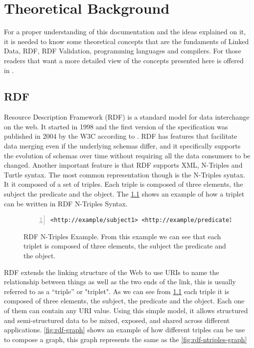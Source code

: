 \chapter{Theoretical Background}
\label{ch:theo-back}

For a proper understanding of this documentation and the ideas explained on it, it is
needed to know some theoretical concepts that are the fundaments of Linked Data, RDF,
RDF Validation, programming languages and compilers. For
those readers that want a more detailed view of the concepts
presented here is offered in \cite{labra-validating-rdf, eric-rdf-validation-lang,
programing-language}.


\section{RDF}
\label{sec:theo-back-rdf}
Resource Description Framework (RDF) is a standard model for data interchange on the web.
It started in 1998 and the first version of the specification was published in 2004 by the W3C
according to \cite{rdf-primer}. RDF has features that facilitate data merging even if the
underlying schemas differ, and it specifically supports the evolution of schemas over time
without requiring all the data consumers to be changed. Another important feature is that RDF
supports XML, N-Triples and Turtle syntax. The most common representation though is the N-Triples syntax.
It it composed of a set of triples. Each triple is composed of three elements, the subject the predicate and the
object. The \cref{fig:rdf-ntriples-ex} shows an example of how a triplet can be written in RDF N-Triples Syntax.

\begin{figure}
\begin{lstlisting}[numbers=left, basicstyle=\ttfamily\scriptsize]
<http://example/subject1> <http://example/predicate1> <http://example/object1> .
\end{lstlisting}
\caption[RDF N-Triples Example]{RDF N-Triples Example. From this example we can see that each triplet is
composed of three elements, the subject the predicate and the object.}
\label{fig:rdf-ntriples-ex}
\end{figure}

RDF extends the linking structure of the Web to use URIs to name the relationship between
things as well as the two ends of the link, this is usually referred to as a “triple” or "triplet".
As we can see from \cref{fig:rdf-ntriples-ex} each triple it is composed of three elements,
the subject, the predicate and the object. Each one of them can contain any URI value.
Using this simple model, it allows structured and semi-structured data to be mixed, exposed,
and shared across different applications. \cref{fig:rdf-graph} shows an example of how different
triples can be use to compose a graph, this graph represents the same as the \cref{fig:rdf-ntriples-graph}

